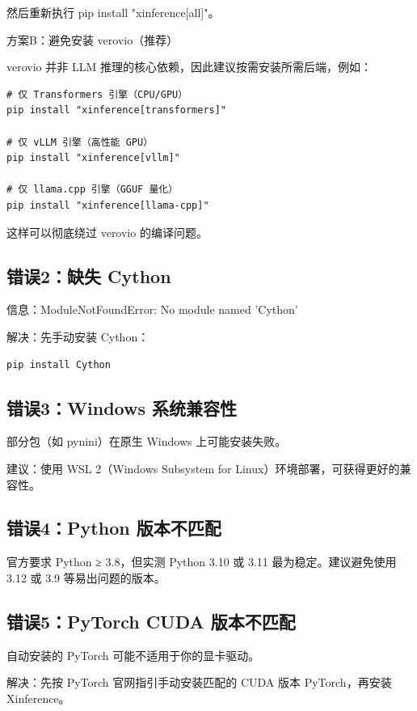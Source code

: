 \documentclass[12pt,UTF8]{ctexbook}
\begin{document}
然后重新执行 pip install "xinference[all]"。

方案B：避免安装 verovio（推荐）

verovio 并非 LLM 推理的核心依赖，因此建议按需安装所需后端，例如：

\begin{lstlisting}
# 仅 Transformers 引擎（CPU/GPU）
pip install "xinference[transformers]"

# 仅 vLLM 引擎（高性能 GPU）
pip install "xinference[vllm]"

# 仅 llama.cpp 引擎（GGUF 量化）
pip install "xinference[llama-cpp]"
\end{lstlisting}

这样可以彻底绕过 verovio 的编译问题。

\subsection{错误2：缺失 Cython}

信息：ModuleNotFoundError: No module named 'Cython'

解决：先手动安装 Cython：

\begin{lstlisting}
pip install Cython
\end{lstlisting}

\subsection{错误3：Windows 系统兼容性}

部分包（如 pynini）在原生 Windows 上可能安装失败。

建议：使用 WSL 2（Windows Subsystem for Linux）环境部署，可获得更好的兼容性。

\subsection{错误4：Python 版本不匹配}

官方要求 Python ≥ 3.8，但实测 Python 3.10 或 3.11 最为稳定。建议避免使用 3.12 或 3.9 等易出问题的版本。

\subsection{错误5：PyTorch CUDA 版本不匹配}

自动安装的 PyTorch 可能不适用于你的显卡驱动。

解决：先按 PyTorch 官网指引手动安装匹配的 CUDA 版本 PyTorch，再安装 Xinference。
\end{document}
